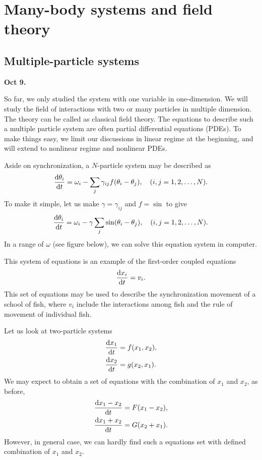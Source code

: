 \chapter{Many-body systems and field theory}



\section{Multiple-particle systems}\label{sec:particles}
\textbf{Oct 9.}

So far, we only studied the system with one variable in  one-dimension. We will study the field of interactions with two or many particles in multiple dimension. The theory can be called as classical field theory. The equations to describe such a multiple particle system are often partial differential equations (PDEs). To make things easy, we limit our discussions in linear regime at the beginning, and will extend to nonlinear regime and nonlinear PDEs. 

Aside on synchronization, a $ N $-particle system may be described as
\begin{align}
\frac{{\mathrm d} {\theta_i}}{{\mathrm d}t}=\omega_i -\sum_j \gamma_{ij} f(\theta_i-\theta_j), \quad (i,j=1,2,\ldots,N).
\end{align}
To make it simple, let us make $ \gamma=\gamma_{ij} $ and $ f=\sin $ to give
\begin{align}
\frac{{\mathrm d} {\theta_i}}{{\mathrm d}t}=\omega_i -\gamma \sum_j  \sin(\theta_i-\theta_j), \quad (i,j=1,2,\ldots,N).
\end{align}
In a range of $ \omega $ (see figure below), we can solve this equation system in computer. 

This system of equations is an example of the first-order coupled equations
\begin{align}
\frac{{\mathrm d} {x_i}}{{\mathrm d}t}=v_i.
\end{align}
This set of equations may be used to describe the synchronization movement of a school of fish, where $ v_i $ include the interactions among fish and the rule of movement of individual fish. 

Let us look at two-particle systems
\begin{align}
\frac{{\mathrm d} {x_1}}{{\mathrm d}t} &= f(x_1,x_2),\\
\frac{{\mathrm d} {x_2}}{{\mathrm d}t} &= g(x_2,x_1).
\end{align}
We may expect to obtain a set of equations with the combination of $ x_1 $ and $ x_2 $, as before, 
\begin{align}
\frac{{\mathrm d} {x_1-x_2}}{{\mathrm d}t} &= F(x_1-x_2),\\
\frac{{\mathrm d} {x_1+x_2}}{{\mathrm d}t} &= G(x_2+x_1).
\end{align}
However, in general case, we can hardly find such a equations set with defined combination of $ x_1 $ and $ x_2 $. 

